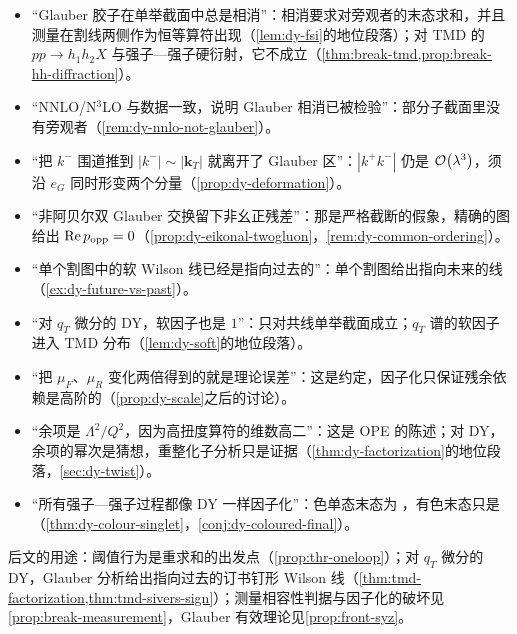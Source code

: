 \begin{tcolorbox}[enhanced,breakable,title=本章涉及的常见误解,fonttitle=\bfseries,
  colback=gray!3!white,colframe=gray!55!black,boxrule=0.6pt,arc=2pt,
  left=5pt,right=5pt,top=3pt,bottom=3pt,before skip=6pt,after skip=6pt]
\small
\begin{itemize}[leftmargin=1.2em,itemsep=0pt,topsep=0pt,parsep=0pt]
\item “Glauber 胶子在单举截面中总是相消”：相消要求对旁观者的末态求和，并且测量在割线两侧作为恒等算符出现（\cref{lem:dy-fsi}的地位段落）；对 TMD 的 $pp\to h_1h_2X$ 与强子—强子硬衍射，它不成立（\cref{thm:break-tmd,prop:break-hh-diffraction}）。
\item “NNLO/N$^3$LO 与数据一致，说明 Glauber 相消已被检验”：部分子截面里没有旁观者（\cref{rem:dy-nnlo-not-glauber}）。
\item “把 $k^-$ 围道推到 $|k^-|\sim|\mathbf k_T|$ 就离开了 Glauber 区”：$|k^+k^-|$ 仍是 $\mathcal{O}\!\left(\lambda^3\right)$，须沿 $e_G$ 同时形变两个分量（\cref{prop:dy-deformation}）。
\item “非阿贝尔双 Glauber 交换留下非幺正残差”：那是严格截断的假象，精确的图给出 $\operatorname{Re} p_{\rm opp}=0$（\cref{prop:dy-eikonal-twogluon}，\cref{rem:dy-common-ordering}）。
\item “单个割图中的软 Wilson 线已经是指向过去的”：单个割图给出指向未来的线（\cref{ex:dy-future-vs-past}）。
\item “对 $q_T$ 微分的 DY，软因子也是 $1$”：只对共线单举截面成立；$q_T$ 谱的软因子进入 TMD 分布（\cref{lem:dy-soft}的地位段落）。
\item “把 $\mu_F$、$\mu_R$ 变化两倍得到的就是理论误差”：这是约定，因子化只保证残余依赖是高阶的（\cref{prop:dy-scale}之后的讨论）。
\item “余项是 $\Lambda^2/Q^2$，因为高扭度算符的维数高二”：这是 OPE 的陈述；对 DY，余项的幂次是猜想，重整化子分析只是证据（\cref{thm:dy-factorization}的地位段落，\cref{sec:dy-twist}）。
\item “所有强子—强子过程都像 DY 一样因子化”：色单态末态为 \tagA，有色末态只是 \tagC（\cref{thm:dy-colour-singlet}，\cref{conj:dy-coloured-final}）。
\end{itemize}
\end{tcolorbox}

后文的用途：阈值行为是重求和的出发点（\cref{prop:thr-oneloop}）；对 $q_T$ 微分的 DY，Glauber 分析给出指向过去的订书钉形 Wilson 线（\cref{thm:tmd-factorization,thm:tmd-sivers-sign}）；测量相容性判据与因子化的破坏见\cref{prop:break-measurement}，Glauber 有效理论见\cref{prop:front-syz}。


